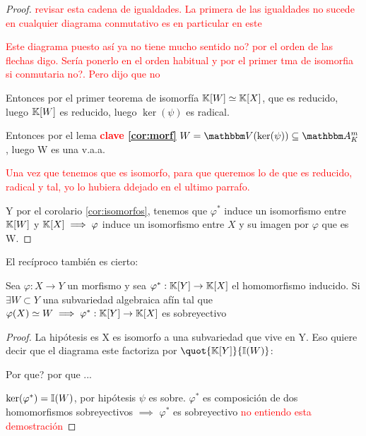 \begin{proof}
\textcolor{red}{revisar esta cadena de igualdades. La primera de las igualdades no sucede en cualquier diagrama conmutativo es en particular en este}


\textcolor{red}{Este diagrama puesto así ya no tiene mucho sentido no? por el orden de las flechas digo. Sería ponerlo en el orden habitual y por el primer tma de isomorfia si conmutaria no?. Pero dijo que no}

Entonces por el primer teorema de isomorfía
$\mathbb{K}[W] \simeq \mathbb{K}[X]$, que es reducido, luego $\mathbb{K}[W]$ es reducido, luego $\ker(\psi)$ es radical.

Entonces por el lema \textcolor{red}{\textbf{clave \ref{cor:morf}}} $W=\V(\ker(\psi)) \subseteq \A_K^m$, luego W es una v.a.a.

\textcolor{red}{Una vez que tenemos que es isomorfo, para que queremos lo de que es reducido, radical y tal, yo lo hubiera ddejado en el ultimo parrafo.}

Y por el corolario \ref{cor:isomorfos}, tenemos que $\varphi^*$ induce un isomorfismo entre $\mathbb{K}[W]$ y $\mathbb{K}[X] \implies \varphi$ induce un isomorfismo entre $X$ y su imagen por $\varphi$ que es W.

\end{proof}

El recíproco también es cierto: 


\begin{lemma}
	Sea $\varphi: X \rightarrow Y$ un morfismo y sea $\varphi^*: \mathbb{K}[Y]\rightarrow \mathbb{K}[X]$ el homomorfismo inducido. Si $\exists W \subset Y$ una subvariedad algebraica afín tal que $\varphi(X) \simeq W \implies \varphi^*:\mathbb{K}[Y] \rightarrow \mathbb{K}[X]$ es sobreyectivo
\end{lemma}

\begin{proof}
	La hipótesis es X es isomorfo a una subvariedad que vive en Y. Eso quiere decir que el diagrama este factoriza por $\quot{\K[Y]}{\I(W)}$:


	Por que? por que ...
	
	$\ker(\varphi^*)=\mathbb{I}(W)$, por hipótesis $\psi$ es sobre. $\varphi^*$ es composición de dos homomorfismos sobreyectivos $\implies$ $\varphi^*$ es sobreyectivo \textcolor{red}{no entiendo esta demostración}

\end{proof}


